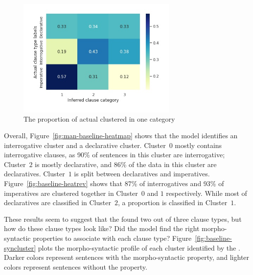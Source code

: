 \begin{figure}[H]
    \centering
    \includegraphics[width=0.7\textwidth]{figures/man-baseline-mid-heatrev.jpg}
    \caption{The proportion of actual \diis{} clustered in one category}
    \label{fig:man-baseline-mid-heatrev}
\end{figure}

Overall, Figure~\ref{fig:man-baseline-heatmap} shows that the \dlearnerabbr{} model identifies an interrogative cluster and a declarative cluster. Cluster~$0$ mostly contains interrogative clauses, as 90\% of sentences in this cluster are interrogative; Cluster~$2$ is mostly declarative, and 86\% of the data in this cluster are declaratives. Cluster~$1$ is split between declaratives and imperatives. Figure~\ref{fig:baseline-heatrev} shows that 87\% of interrogatives and 93\% of imperatives are clustered together in Cluster~$0$ and $1$ respectively. While most of declaratives are classified in Cluster~$2$, a proportion is classified in Cluster~$1$.

These results seem to suggest that the \dlearnerabbr{} found two out of three clause types, but how do these clause types look like? Did the model find the right morpho-syntactic properties to associate with each clause type? Figure~\ref{fig:baseline-syncluster} plots the morpho-syntactic profile of each cluster identified by the \dlearnerabbr{}. Darker colors represent sentences with the morpho-syntactic property, and lighter colors represent sentences without the property. 

